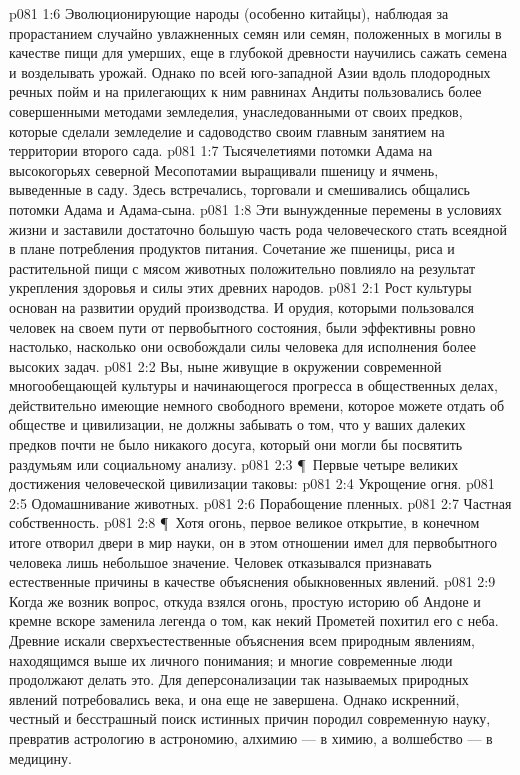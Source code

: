 \vs p081 1:6 Эволюционирующие народы (особенно китайцы), наблюдая за прорастанием случайно увлажненных семян или семян, положенных в могилы в качестве пищи для умерших, еще в глубокой древности научились сажать семена и возделывать урожай. Однако по всей юго\hyp{}западной Азии вдоль плодородных речных пойм и на прилегающих к ним равнинах Андиты пользовались более совершенными методами земледелия, унаследованными от своих предков, которые сделали земледелие и садоводство своим главным занятием на территории второго сада.
\vs p081 1:7 Тысячелетиями потомки Адама на высокогорьях северной Месопотамии выращивали пшеницу и ячмень, выведенные в саду. Здесь встречались, торговали и смешивались общались потомки Адама и Адама\hyp{}сына.
\vs p081 1:8 Эти вынужденные перемены в условиях жизни и заставили достаточно большую часть рода человеческого стать всеядной в плане потребления продуктов питания. Сочетание же пшеницы, риса и растительной пищи с мясом животных положительно повлияло на результат укрепления здоровья и силы этих древних народов.
\vs p081 2:1 Рост культуры основан на развитии орудий производства. И орудия, которыми пользовался человек на своем пути от первобытного состояния, были эффективны ровно настолько, насколько они освобождали силы человека для исполнения более высоких задач.
\vs p081 2:2 Вы, ныне живущие в окружении современной многообещающей культуры и начинающегося прогресса в общественных делах, действительно имеющие немного свободного времени, которое можете отдать  об обществе и цивилизации, не должны забывать о том, что у ваших далеких предков почти не было никакого досуга, который они могли бы посвятить раздумьям или социальному анализу.
\vs p081 2:3 \P\ Первые четыре великих достижения человеческой цивилизации таковы:
\vs p081 2:4 \bibnobreakspace Укрощение огня.
\vs p081 2:5 \bibnobreakspace Одомашнивание животных.
\vs p081 2:6 \bibnobreakspace Порабощение пленных.
\vs p081 2:7 \bibnobreakspace Частная собственность.
\vs p081 2:8 \P\ Хотя огонь, первое великое открытие, в конечном итоге отворил двери в мир науки, он в этом отношении имел для первобытного человека лишь небольшое значение. Человек отказывался признавать естественные причины в качестве объяснения обыкновенных явлений.
\vs p081 2:9 Когда же возник вопрос, откуда взялся огонь, простую историю об Андоне и кремне вскоре заменила легенда о том, как некий Прометей похитил его с неба. Древние искали сверхъестественные объяснения всем природным явлениям, находящимся выше их личного понимания; и многие современные люди продолжают делать это. Для деперсонализации так называемых природных явлений потребовались века, и она еще не завершена. Однако искренний, честный и бесстрашный поиск истинных причин породил современную науку, превратив астрологию в астрономию, алхимию --- в химию, а волшебство --- в медицину.
